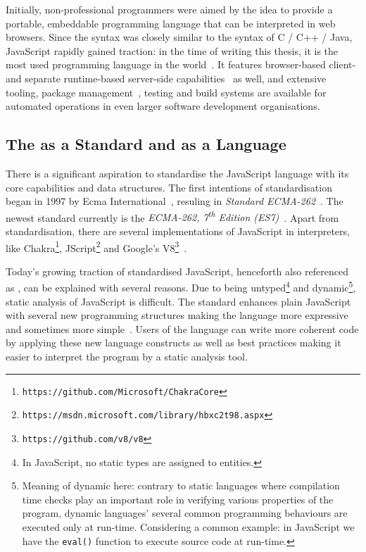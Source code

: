 Initially, non-professional programmers were aimed by the idea to provide a portable, embeddable programming language that can be interpreted in web browsers. Since the syntax was closely similar to the syntax of C / C++ / Java, JavaScript rapidly gained traction: in the time of writing this thesis, it is the most used programming language in the world~\cite{javascriptstackoverflow}. It features browser-based client- and separate runtime-based server-side capabilities~\cite{nodejs} as well, and extensive tooling, package management~\cite{npmjs}, testing and build systems are available for automated operations in even larger software development organisations.


\subsection{The \es as a Standard and as a Language}

There is a significant aspiration to standardise the JavaScript language with its core capabilities and data structures. The first intentions of standardisation began in 1997 by Ecma International~\cite{webedjavascripthistory}, resuling in \emph{Standard ECMA-262}~\cite{ecmascriptstandardfirstversion}. The newest standard currently is the \emph{ECMA-262, 7\textsuperscript{th} Edition (ES7)}~\cite{ecmascriptstandard}. Apart from standardisation, there are several implementations of JavaScript in interpreters, like Chakra\footnote{\texttt{https://github.com/Microsoft/ChakraCore}}, JScript\footnote{\texttt{https://msdn.microsoft.com/library/hbxc2t98.aspx}} and Google's V8\footnote{\texttt{https://github.com/v8/v8}}~\cite{stein-daniel-msc}.

Today's growing traction of standardised JavaScript, henceforth also referenced as \es, can be explained with several reasons. Due to being untyped\footnote{In JavaScript, no static types are assigned to entities.} and dynamic\footnote{Meaning of dynamic here: contrary to static languages where compilation time checks play an important role in verifying various properties of the program, dynamic languages' several common programming behaviours are executed only at run-time. Considering a common example: in JavaScript we have the \texttt{eval()} function to execute source code at run-time.}, static analysis of JavaScript is difficult. The \es standard enhances plain JavaScript with several new programming structures making the language more expressive and sometimes more simple~\cite{es6-features}. Users of the language can write more coherent code by applying these new language constructs as well as best practices making it easier to interpret the program by a static analysis tool.


